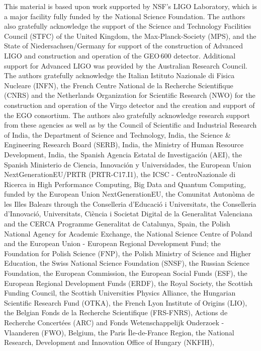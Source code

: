 This material is based upon work supported by NSF's LIGO Laboratory, which is a
major facility fully funded by the National Science Foundation.
The authors also gratefully acknowledge the support of
the Science and Technology Facilities Council (STFC) of the
United Kingdom, the Max-Planck-Society (MPS), and the State of
Niedersachsen/Germany for support of the construction of Advanced LIGO 
and construction and operation of the GEO\,600 detector. 
Additional support for Advanced LIGO was provided by the Australian Research Council.
The authors gratefully acknowledge the Italian Istituto Nazionale di Fisica Nucleare (INFN),  
the French Centre National de la Recherche Scientifique (CNRS) and
the Netherlands Organization for Scientific Research (NWO)
for the construction and operation of the Virgo detector
and the creation and support  of the EGO consortium. 
The authors also gratefully acknowledge research support from these agencies as well as by 
the Council of Scientific and Industrial Research of India, 
the Department of Science and Technology, India,
the Science \& Engineering Research Board (SERB), India,
the Ministry of Human Resource Development, India,
the Spanish Agencia Estatal de Investigaci\'on (AEI),
the Spanish Ministerio de Ciencia, Innovaci\'on y Universidades,
the European Union NextGenerationEU/PRTR (PRTR-C17.I1),
the ICSC - CentroNazionale di Ricerca in High Performance Computing, Big Data
and Quantum Computing, funded by the European Union NextGenerationEU,
the Comunitat Auton\`oma de les Illes Balears through the Conselleria d'Educaci\'o i Universitats,
the Conselleria d'Innovaci\'o, Universitats, Ci\`encia i Societat Digital de la Generalitat Valenciana and
the CERCA Programme Generalitat de Catalunya, Spain,
the Polish National Agency for Academic Exchange,
the National Science Centre of Poland and the European Union - European Regional
Development Fund;
the Foundation for Polish Science (FNP),
the Polish Ministry of Science and Higher Education,
the Swiss National Science Foundation (SNSF),
the Russian Science Foundation,
the European Commission,
the European Social Funds (ESF),
the European Regional Development Funds (ERDF),
the Royal Society, 
the Scottish Funding Council, 
the Scottish Universities Physics Alliance, 
the Hungarian Scientific Research Fund (OTKA),
the French Lyon Institute of Origins (LIO),
the Belgian Fonds de la Recherche Scientifique (FRS-FNRS), 
Actions de Recherche Concert\'ees (ARC) and
Fonds Wetenschappelijk Onderzoek - Vlaanderen (FWO), Belgium,
the Paris \^{I}le-de-France Region, 
the National Research, Development and Innovation Office of Hungary (NKFIH), 
